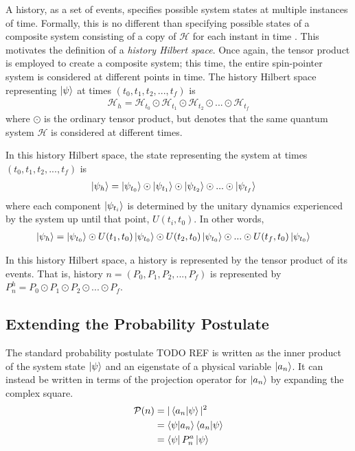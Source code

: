 %
%

A history, as a set of events, specifies possible system states at multiple instances of time. Formally, this is no different than specifying possible states of a composite system consisting of a copy of $\mathcal{H}$ for each instant in time \cite{Griffiths}. This motivates the definition of a \textit{history Hilbert space}. Once again, the tensor product is employed to create a composite system; this time, the entire spin-pointer system is considered at different points in time. The history Hilbert space representing $\ket{\psi}$ at times $\left(t_0, t_1, t_2, ..., t_f \right)$ is
\begin{align}
  {\mathcal{H}}_h = \mathcal{H}_{t_0} \odot \mathcal{H}_{t_1} \odot \mathcal{H}_{t_2} \odot ... \odot \mathcal{H}_{t_f}
\end{align}
where $\odot$ is the ordinary tensor product, but denotes that the same quantum system $\mathcal{H}$ is considered at different times.

In this history Hilbert space, the state representing the system at times $\left(t_0, t_1, t_2, ..., t_f \right)$ is
\begin{align}
  \ket{\psi_h} &= \ket{\psi_{t_0}} \odot \ket{\psi_{t_1}} \odot \ket{\psi_{t_2}} \odot ... \odot \ket{\psi_{t_f}}
\end{align}
where each component $\ket{\psi_{t_i}}$ is determined by the unitary dynamics experienced by the system up until that point, $U(t_i, t_0)$. In other words,
\begin{align}
  \ket{\psi_h} &= \ket{\psi_{t_0}} \odot U(t_1, t_0)\ket{\psi_{t_0}} \odot U(t_2, t_0)\ket{\psi_{t_0}} \odot ... \odot U(t_f, t_0)\ket{\psi_{t_0}}
\end{align}

In this history Hilbert space, a history is represented by the tensor product of its events. That is, history $n = \left( P_0, P_1, P_2, ... , P_f \right)$ is represented by $P^h_n = P_0 \odot P_1 \odot P_2 \odot ... \odot P_f $.

\subsection{Extending the Probability Postulate}
The standard probability postulate TODO REF is written as the inner product of the system state $\ket{\psi}$ and an eigenstate of a physical variable $\ket{a_n}$. It can instead be written in terms of the projection operator for $\ket{a_n}$ by expanding the complex square.
\begin{align}
        \mathcal{P}(n) &= |\braket{a_n|\psi}|^2 \\ \nonumber
        &= \braket{\psi|a_n} \braket{a_n|\psi} \\ \nonumber
        &= \bra{\psi} P^a_n \ket{\psi}
\end{align}

